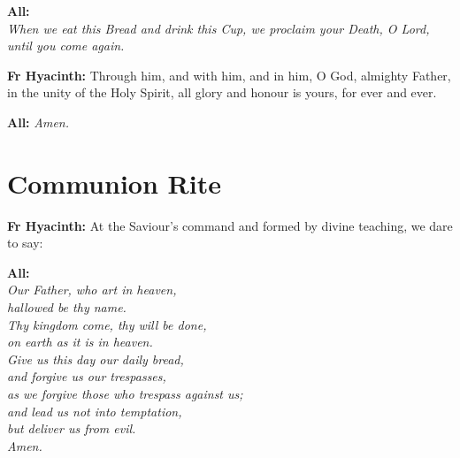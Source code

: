\documentclass[12pt,landscape]{article}
\begin{document}
\begin{multicols}{2}
\textbf{All:} \\
\textit{When we eat this Bread and drink this Cup, we proclaim your Death, O Lord, until you come again.}

\vspace{1em}

\textbf{Fr Hyacinth:} Through him, and with him, and in him, O God, almighty Father, in the unity of the Holy Spirit, all glory and honour is yours, for ever and ever.

\vspace{0.5em}

\textbf{All:} \textit{Amen.}

\vspace{1.5em}

\section*{Communion Rite}

\textbf{Fr Hyacinth:} At the Saviour's command and formed by divine teaching, we dare to say:

\vspace{0.5em}

\textbf{All:} \\
\textit{Our Father, who art in heaven,\\
hallowed be thy name.\\
Thy kingdom come, thy will be done,\\
on earth as it is in heaven.\\
Give us this day our daily bread,\\
and forgive us our trespasses,\\
as we forgive those who trespass against us;\\
and lead us not into temptation,\\
but deliver us from evil.\\
Amen.}

\end{multicols}
\end{document}
